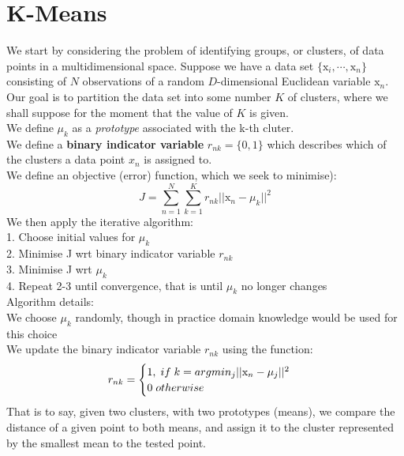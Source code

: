 \section{K-Means}
We start by considering the problem of identifying groups, or clusters, of data points in a multidimensional space. Suppose we have a data set $\{\mathrm{x}_i,\cdots,\mathrm{x}_n\}$ consisting
of $N$ observations of a random $D$-dimensional Euclidean variable $\mathrm{x}_n$. Our goal is to partition the data set into some number $K$ of clusters, where we shall suppose for the moment that the value of $K$ is given. \\ 
We define $\mu_k$ as a \textit{prototype} associated with the k-th cluter. \\
We define a \textbf{binary indicator variable} $r_{nk}=\{0,1\}$ which describes which of the clusters a data point $x_n$ is assigned to. \\
We define an objective (error) function, which we seek to minimise):
\begin{equation}
    J = \sum_{n=1}^N \sum_{k=1}^K r_{nk} ||\mathrm{x}_n-\mu_k||^2 \label{objective-function}
\end{equation}
We then apply the iterative algorithm: \\
1. Choose initial values for $\mu_k$ \\
2. Minimise J wrt binary indicator variable $r_{nk}$ \\
3. Minimise J wrt $\mu_k$ \\
4. Repeat 2-3 until convergence, that is until $\mu_k$ no longer changes \\
Algorithm details: \\
We choose $\mu_k$ randomly, though in practice domain knowledge would be used for this choice \\
We update the binary indicator variable $r_{nk}$ using the function: \\
$$
r_{nk} = \begin{cases}
               1,\hspace{1mm} if \hspace{1mm} k = argmin_j||\mathrm{x}_n-\mu_j||^2 \\
               0\hspace{1mm}otherwise
            \end{cases}
$$
That is to say, given two clusters, with two prototypes (means), we compare the distance of a given point to both means, and assign it to the cluster represented by the smallest mean to the tested point. \\
